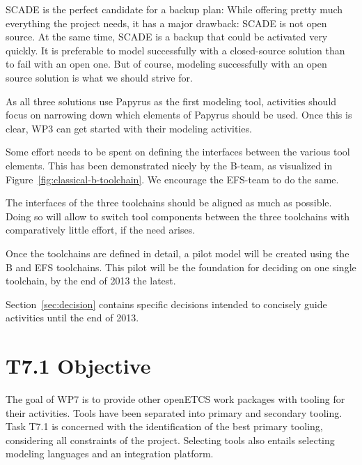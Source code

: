 SCADE is the perfect candidate for a backup plan: While offering pretty much everything the project needs, it has a major drawback: SCADE is not open source.  At the same time, SCADE is a backup that could be activated very quickly.  It is preferable to model successfully with a closed-source solution than to fail with an open one.  But of course, modeling successfully with an open source solution is what we should strive for.

As all three solutions use Papyrus as the first modeling tool, activities should focus on narrowing down which elements of Papyrus should be used.  Once this is clear, WP3 can get started with their modeling activities.

Some effort needs to be spent on defining the interfaces between the various tool elements.  This has been demonstrated nicely by the B-team, as visualized in Figure~\ref{fig:classical-b-toolchain}.  We encourage the EFS-team to do the same.

The interfaces of the three toolchains should be aligned as much as possible.  Doing so will allow to switch tool components between the three toolchains with comparatively little effort, if the need arises.

Once the toolchains are defined in detail, a pilot model will be created using the B and EFS toolchains.  This pilot will be the foundation for deciding on one single toolchain, by the end of 2013 the latest.

Section~\ref{sec:decision} contains specific decisions intended to concisely guide activities until the end of 2013.

\section{T7.1 Objective}

The goal of WP7 is to provide other openETCS work packages with tooling for their activities.  Tools have been separated into primary and secondary tooling.  Task T7.1 is concerned with the identification of the best primary tooling, considering all constraints of the project.  Selecting tools also entails selecting modeling languages and an integration platform.

